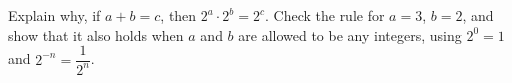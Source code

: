 Explain why, if $a+b=c$, then $2^a\cdot2^b=2^c$. Check the rule for $a=3$, $b=2$, and show that it also holds when $a$ and $b$ are allowed to be any integers, using $2^0=1$ and $2^{-n}=\dfrac{1}{2^n}$.

